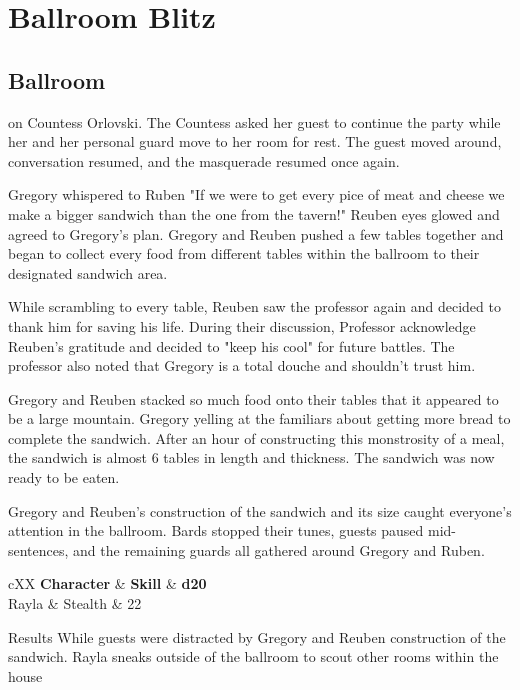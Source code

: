 \chapter{Ballroom Blitz}
\section{Ballroom}

 on Countess Orlovski. The Countess asked her guest to continue the party while her and her personal guard move to her room for rest. The guest moved around, conversation resumed, and the masquerade resumed once again.

Gregory whispered to Ruben "If we were to get every pice of meat and cheese we make a bigger sandwich than the one from the tavern!" Reuben eyes glowed and agreed to Gregory's plan. Gregory and Reuben pushed a few tables together and began to collect every food from different tables within the ballroom to their designated sandwich area.

While scrambling to every table, Reuben saw the professor again and decided to thank him for saving his life. During their discussion, Professor acknowledge Reuben's gratitude and decided to "keep his cool" for future battles. The professor also noted that Gregory is a total douche and shouldn't trust him.

Gregory and Reuben stacked so much food onto their tables that it appeared to be a large mountain. Gregory yelling at the familiars about getting more bread to complete the sandwich. After an hour of constructing this monstrosity of a meal, the sandwich is almost 6 tables in length and thickness. The sandwich was now ready to be eaten.

Gregory and Reuben's construction of the sandwich and its size caught everyone's attention in the ballroom. Bards stopped their tunes, guests paused mid-sentences, and the remaining guards all gathered around Gregory and Ruben. 

\begin{DndTable}[color=PhbLightCyan]{cXX}
	\textbf{Character} & \textbf{Skill} & \textbf{d20} \\
	Rayla & Stealth  & 22 \\
\end{DndTable}

\begin{DndComment}{Results}
	While guests were distracted by Gregory and Reuben construction of the sandwich. Rayla sneaks outside of the ballroom to scout other rooms within the house
\end{DndComment}


